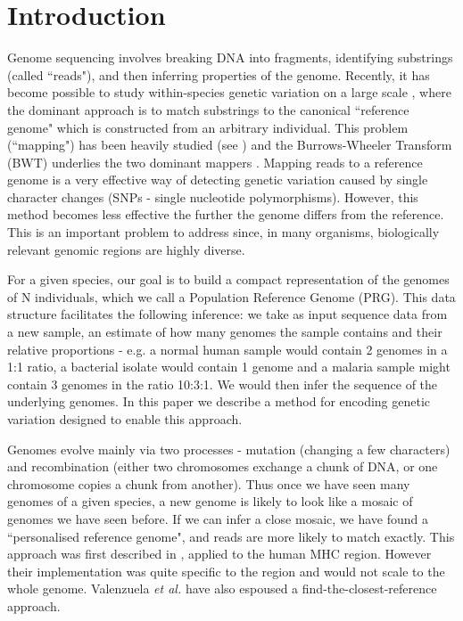 \documentclass[runningheads,a4paper]{llncs}
\begin{document}
\section{Introduction}

Genome sequencing involves breaking DNA into fragments, identifying substrings (called ``reads"), and then inferring properties of the genome. Recently, it has become possible to study within-species genetic variation on a large scale \cite{1000g,arabi}, where the dominant approach is to match substrings to the canonical ``reference genome" which is constructed from an arbitrary individual. This problem (``mapping") has been heavily studied (see \cite{reinert}) and the Burrows-Wheeler Transform (BWT) \cite{bwt} underlies the two dominant mappers \cite{bwa,bowtie}. Mapping reads to a reference genome is a very effective way of detecting genetic variation caused by single character changes (SNPs - single nucleotide polymorphisms). However, this method becomes less effective the further the genome differs from the reference. This is an important problem to address since, in many organisms, biologically relevant genomic regions are highly diverse. 

For a given species, our goal is to build a compact representation of the genomes of N individuals, which we call a Population Reference Genome (PRG). This data structure facilitates the following inference: we take as input sequence data from a new sample, an estimate of how many genomes the sample contains and their relative proportions - e.g. a normal human sample would contain 2 genomes in a 1:1 ratio, a bacterial isolate would contain 1 genome and a malaria sample might contain 3 genomes in the ratio 10:3:1. We would then infer the sequence of the underlying genomes. In this paper we describe a method for encoding genetic variation designed to enable this approach. 

Genomes evolve mainly via two processes - mutation (changing a few characters) and recombination (either two chromosomes exchange a chunk of DNA, or one chromosome copies a chunk from another). Thus once we have seen many genomes of a given species, a new genome is likely to look like a mosaic of genomes we have seen before. If we can infer a close mosaic, we have found a ``personalised reference genome", and reads are more likely to match exactly. This approach was first described in \cite{dilthey}, applied to the human MHC region. However their implementation was quite specific to the region and would not scale to the whole genome. Valenzuela \textit{et al.} \cite{valen} have  also espoused a find-the-closest-reference approach.
\end{document}
